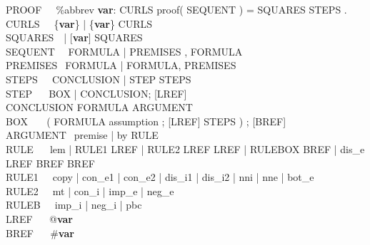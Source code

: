 \documentclass[BA.tex]{subfiles}
\begin{document}
\newcommand{\id}{{\bf var}}
\newcommand{\atom}{{\id}}
{\ttfamily
\noindent
PROOF $~~~~~$\tra \%abbrev \id: CURLS proof( SEQUENT ) =
                  SQUARES STEPS .\\
CURLS $~~~~~$\tra \{\atom\} | \{\atom\} CURLS\\
SQUARES $~~~$\tra [\atom] | [\atom] SQUARES\\
SEQUENT $~~~$\tra \txt{|-} FORMULA | PREMISES , \txt{|-} FORMULA\\
PREMISES $~~$\tra FORMULA | FORMULA, PREMISES\\
STEPS $~~~~~$\tra CONCLUSION | STEP STEPS\\
STEP $~~~~~~$\tra BOX | CONCLUSION; [LREF]\\
CONCLUSION   \tra FORMULA ARGUMENT\\
BOX $~~~~~~~$\tra ( FORMULA assumption ; [LREF] STEPS ) ; [BREF]\\
ARGUMENT $~~$\tra premise | by RULE \\
RULE $~~~~~~$\tra lem | RULE1 LREF | RULE2 LREF LREF | 
                  RULEBOX BREF |
                  dis\_e LREF BREF BREF\\
RULE1 $~~~~~$\tra copy | con\_e1 | con\_e2 |
                  dis\_i1 | 
                  dis\_i2 | nni | nne | bot\_e\\
RULE2 $~~~~~$\tra mt | con\_i | imp\_e | neg\_e\\
RULEB $~~~~~$\tra imp\_i | neg\_i | pbc\\
LREF $~~~~~~$\tra @\id\\
BREF $~~~~~~$\tra \#\id
}
\end{document}
